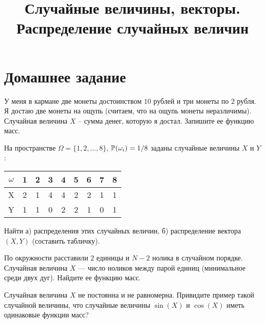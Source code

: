 

\title{Случайные величины, векторы. Распределение случайных величин}
\date{\vspace{-1cm}}


\maketitle

\section*{Домашнее задание}
\begin{problem}
    У меня в кармане две монеты достоинством $10$ рублей и три монеты по $2$ рубля.
    Я достаю две монеты на ощупь (считаем, что на ощупь монеты неразличимы).
    Случайная величина $X$ -- сумма денег, которую я достал.
    Запишите ее функцию масс.
\end{problem}

\begin{problem}
    На пространстве $\Omega = \{1, 2, \ldots, 8\}$, $\operatorname{\mathbb{P}}(\omega_i) = 1 / 8$ заданы случайные величины $X$ и $Y$:
    \begin{center}
    \begin{tabular}{c|c|c|c|c|c|c|c|c}
        $\omega$ & 1 & 2 & 3 & 4 & 5 & 6 & 7 & 8 \\
        \hline
        X & 2 & 1 & 4 & 4 & 2 & 2 & 1 & 1 \\
        \hline
        Y & 1 & 1 & 0 & 2 & 2 & 1 & 0 & 1 \\
    \end{tabular}
    \end{center}
    Найти а) распределения этих случайных величин, б) распределение вектора $(X, Y)$ (составить табличку).
\end{problem}

\begin{problem}
    По окружности расставили $2$ единицы и $N - 2$ нолика в случайном порядке.
    Случайная величина $X$ — число ноликов между парой единиц (минимальное среди двух дуг).
    Найдите ее функцию масс.
\end{problem}

\begin{problem}
    Случайная величина $X$ не постоянна и не равномерна.
    Привидите пример такой случайной величины, что случайные величины $\sin(X)$ и $\cos(X)$ иметь одинаковые функции масс?
\end{problem}

